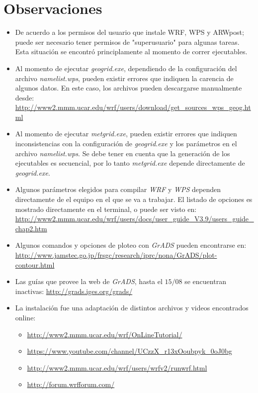 \documentclass[12pt,letter]{article}
\begin{document}
\section*{Observaciones}
\begin{itemize}
\item De acuerdo a los permisos del usuario que instale WRF, WPS y ARWpost; puede ser necesario tener permisos de "superusuario" para algunas tareas. Esta situaci\'on se encontr\'o principlamente al momento de correr ejecutables.

\item Al momento de ejecutar \textit{geogrid.exe}, dependiendo de la configuraci\'on del archivo \textit{namelist.wps}, pueden existir errores que indiquen la carencia de algunos datos. En este caso, los archivos pueden descargarse manualmente desde: \url{http://www2.mmm.ucar.edu/wrf/users/download/get_sources_wps_geog.html}

\item Al momento de ejecutar \textit{metgrid.exe}, pueden existir errores que indiquen inconsistencias con la configuraci\'on de \textit{geogrid.exe} y los par\'ametros en el archivo \textit{namelist.wps}. Se debe tener en cuenta que la generaci\'on de los ejecutables es secuencial, por lo tanto \textit{metgrid.exe} depende directamente de \textit{geogrid.exe}.

\item Algunos par\'ametros elegidos para compilar \textit{WRF} y \textit{WPS} dependen directamente de el equipo en el que se va a trabajar. El listado de opciones es mostrado directamente en el terminal, o puede ser visto en: \url{http://www2.mmm.ucar.edu/wrf/users/docs/user_guide_V3.9/users_guide_chap2.htm}

\item Algunos comandos y opciones de ploteo con \textit{GrADS} pueden encontrarse en: \url{http://www.jamstec.go.jp/frsgc/research/iprc/nona/GrADS/plot-contour.html}

\item Las gu\'ias que provee la web de \textit{GrADS}, hasta el $15/ 08$ se encuentran inactivas: \url {http://grads.iges.org/grads/}

\item La instalaci\'on fue una adaptaci\'on de distintos archivos y videos encontrados online: 
\begin{itemize}
\item \url{http://www2.mmm.ucar.edu/wrf/OnLineTutorial/}
\item \url{https://www.youtube.com/channel/UCzzX_r13xOoubpyk_0oJ0bg}
\item \url{http://www2.mmm.ucar.edu/wrf/users/wrfv2/runwrf.html}
\item \url{http://forum.wrfforum.com/}
\end{itemize}
\end{itemize}
\end{document}

